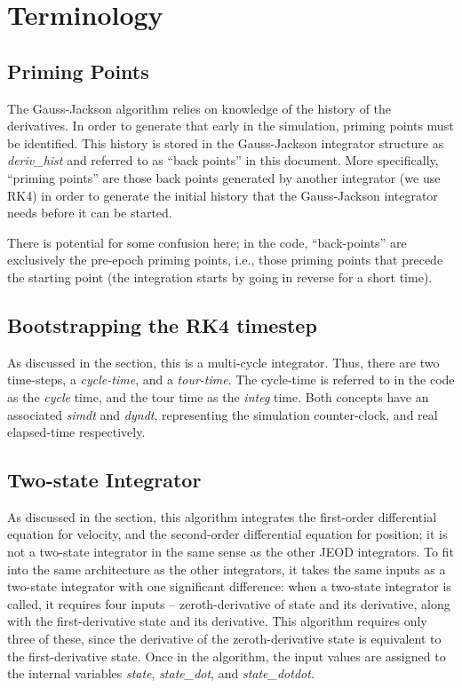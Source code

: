 \section{Terminology}
\subsection{Priming Points}
The Gauss-Jackson algorithm relies on knowledge of the history of the
derivatives. In order to generate that early in the simulation,
priming points must be identified. This history is stored in the
Gauss-Jackson integrator structure as \textit{deriv\_hist} and referred to as
``back points'' in this document. More specifically, ``priming
points'' are those back points generated by another integrator (we use RK4)
in order to generate the initial history that the Gauss-Jackson integrator
needs before it can be started. 

There is potential for some confusion here; in the code,
``back-points'' are exclusively the
pre-epoch priming points, i.e., those priming points that precede the
starting point (the integration starts by going in reverse for a
short time).

\subsection{Bootstrapping the RK4 timestep}
As discussed in the  section, this is a multi-cycle 
integrator.  Thus, there are two
time-steps, a \textit{cycle-time}, and a \textit{tour-time}. The cycle-time is 
referred to in the code as the \textit{cycle} time, and the tour time as the 
\textit{integ} time.  Both concepts have an associated \textit{simdt} and
\textit{dyndt}, representing the simulation counter-clock, and real
elapsed-time respectively.

\subsection{Two-state Integrator}
As discussed in the  section, 
this algorithm integrates the
first-order differential equation for velocity, and the second-order
differential equation for position; it is not a two-state
integrator in the same sense as the other JEOD integrators. 
To fit into the same
architecture as the other integrators, it takes the same inputs as a two-state
integrator with one significant difference: when a two-state integrator
is called, it requires four inputs -- zeroth-derivative of state and
its derivative, along with the first-derivative state and its
derivative. This algorithm requires only three of these, since the
derivative of the zeroth-derivative state is equivalent to the
first-derivative state. Once in the algorithm, the input values
are assigned to the internal variables \textit{state},
\textit{state\_dot}, and \textit{state\_dotdot.}

